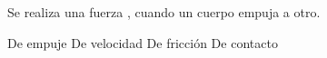 
\question Se realiza una fuerza \fillin \enspace, cuando un cuerpo empuja
          a otro.

  \begin{oneparchoices}
    \choice De empuje
    \choice De velocidad
    \choice De fricción
    \CorrectChoice De contacto
  \end{oneparchoices}
  \answerline[D]

